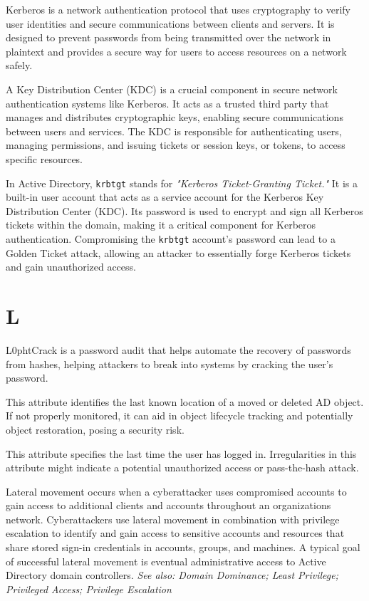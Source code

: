   Kerberos is a network authentication protocol that uses cryptography to verify user identities and secure communications between clients and servers. It is designed to prevent passwords from being transmitted over the network in plaintext and provides a secure way for users to access resources on a network safely.

A Key Distribution Center (KDC) is a crucial component in secure network authentication systems like Kerberos. It acts as a trusted third party that manages and distributes cryptographic keys, enabling secure communications between users and services. The KDC is responsible for authenticating users, managing permissions, and issuing tickets or session keys, or tokens, to access specific resources.

  In Active Directory, \texttt{krbtgt} stands for \textit{"Kerberos Ticket-Granting Ticket."} It is a built-in user account that acts as a service account for the Kerberos Key Distribution Center (KDC). Its password is used to encrypt and sign all Kerberos tickets within the domain, making it a critical component for Kerberos authentication. Compromising the \texttt{krbtgt} account's password can lead to a Golden Ticket attack, allowing an attacker to essentially forge Kerberos tickets and gain unauthorized access.

\section*{L}
 L0phtCrack is a password audit that helps automate the recovery of passwords from hashes, helping attackers to break into systems by cracking the user’s password.

 This attribute identifies the last known location of a moved or deleted AD object. If not properly monitored, it can aid in object lifecycle tracking and potentially object restoration, posing a security risk.

 This attribute specifies the last time the user has logged in. Irregularities in this attribute might indicate a potential unauthorized access or pass-the-hash attack.

 Lateral movement occurs when a cyberattacker uses compromised accounts to gain access to additional clients and accounts throughout an organizations network. Cyberattackers use lateral movement in combination with privilege escalation to identify and gain access to sensitive accounts and resources that share stored sign-in credentials in accounts, groups, and machines. A typical goal of successful lateral movement is eventual administrative access to Active Directory domain controllers.
\textit{See also: Domain Dominance; Least Privilege; Privileged Access; Privilege Escalation}

